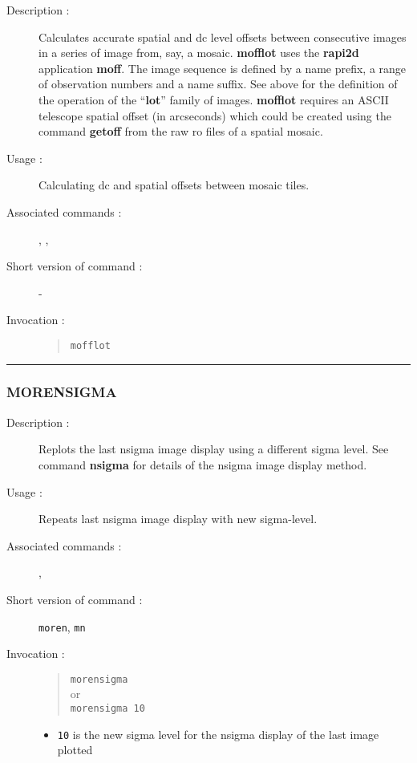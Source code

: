 \begin{description}

\item[Description :] Calculates accurate spatial and dc level offsets
between consecutive images in a series of image from, say, a mosaic.
{\bf mofflot} uses the {\bf rapi2d} application {\bf moff}.  The image
sequence is defined by a name prefix, a range of observation numbers
and a name suffix.  See above for the definition of the operation of
the ``{\bf lot}'' family of images.  {\bf mofflot} requires an ASCII
telescope spatial offset (in arcseconds) which could be created using
the command {\bf getoff} from the raw {\sc ro} files of a spatial
mosaic.

\item[Usage :] Calculating dc and spatial offsets between mosaic tiles.
\item[Associated commands :] {\tt {}},
{\tt {}}, {\tt {}}
\item[Short version of command :] -
\item[Invocation :]

\begin{quote}{\tt  mofflot }\end{quote}

\end{description}

\hrule
\subsubsection*{\label{MORENSIGMA}MORENSIGMA}

\begin{description}

\item[Description :] Replots the last nsigma image display using a
different sigma level.  See command {\bf nsigma} for details of the nsigma
image display method.

\item[Usage :] Repeats last nsigma image display with new sigma-level.
\item[Associated commands :] {\tt {}},
{\tt {}}
\item[Short version of command :] {\tt moren}, {\tt mn}
\item[Invocation :]

\begin{quote}{\tt  morensigma }\\
or \\
{\tt morensigma 10 }
\end{quote}

\begin{itemize}

\item {\tt 10} is the new sigma level for the nsigma display of the last
image plotted
\end{itemize}

\end{description}

